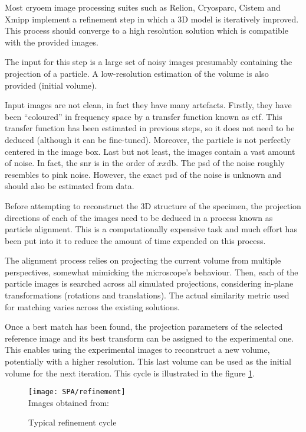 \documentclass[../main.tex]{subfiles}
\begin{document}
Most \gls{cryoem} image processing suites such as Relion\cite{scheres2021}, Cryosparc\cite{cryosparc}, Cistem\cite{grigorieff2018} and Xmipp\cite{sorzano2021} implement a refinement step in which a 3D model is iteratively improved. This process should converge to a high resolution solution which is compatible with the provided images. 

The input for this step is a large set of noisy images presumably containing the projection of a particle. A low-resolution estimation of the volume is also provided (initial volume).

Input images are not clean, in fact they have many artefacts. Firstly, they have been ``coloured'' in frequency space by a transfer function known as \gls{ctf}. This transfer function has been estimated in previous steps, so it does not need to be deduced (although it can be fine-tuned). Moreover, the particle is not perfectly centered in the image box. Last but not least, the images contain a vast amount of noise. In fact, the \gls{snr} is in the order of $xx \si{\decibel}$. The \gls{psd} of the noise roughly resembles to pink noise. However, the exact \gls{psd} of the noise is unknown and should also be estimated from data.

Before attempting to reconstruct the 3D structure of the specimen, the projection directions of each of the images need to be deduced in a process known as particle alignment. This is a computationally expensive task and much effort has been put into it to reduce the amount of time expended on this process. 

The alignment process relies on projecting the current volume from multiple perspectives, somewhat mimicking the microscope's behaviour. Then, each of the particle images is searched across all simulated projections, considering in-plane transformations (rotations and translations). The actual similarity metric used for matching varies across the existing solutions. 

Once a best match has been found, the projection parameters of the selected reference image and its best transform can be assigned to the experimental one. This enables using the experimental images to reconstruct a new volume, potentially with a higher resolution. This last volume can be used as the initial volume for the next iteration. This cycle is illustrated in the figure \ref{fig:3:refinement}. 

\begin{figure}[h]
    \centering
    \texttt{[image: SPA/refinement]}\\
    Images obtained from: \cite{nogales2015}
    \caption{Typical refinement cycle}
    \label{fig:3:refinement}
\end{figure}
\end{document}
